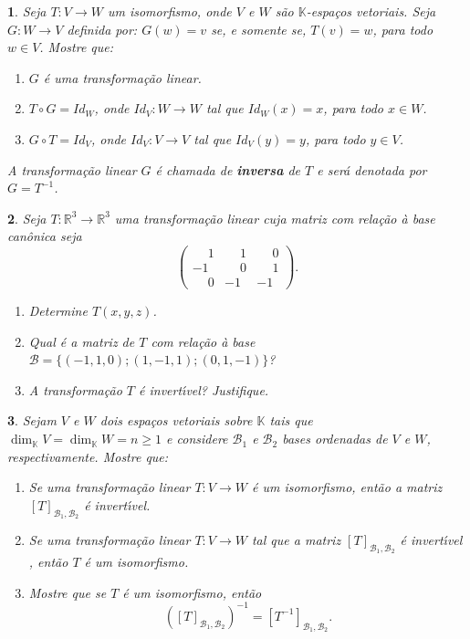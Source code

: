 \documentclass[12pt]{exam}
\newtheorem{exercicio}{}
\newcommand{\real}{\mathbb{R}}
\newcommand{\cp}[1]{\mathbb{#1}}
\begin{document}
\begin{exercicio}
  Seja $T : V \to W$ um isomorfismo, onde $V$ e $W$ s\~ao $\cp{K}$-espa\c{c}os vetoriais. Seja $G : W \to V$ definida por: $G(w) = v$ se, e somente se, $T(v) = w$, para todo $w \in V$. Mostre que:
  \begin{enumerate}[label=({\alph*})]
    \item $G$ \'e uma transforma\c{c}\~ao linear.
    \item $T\circ G = Id_W$, onde $Id_V : W \to W$ tal que $Id_W(x) = x$, para todo $x \in W$.
    \item $G\circ T = Id_V$, onde $Id_V : V \to V$ tal que $Id_V(y) = y$, para todo $y \in V$.
  \end{enumerate}
  A transforma\c{c}\~ao linear $G$ \'e chamada de \textbf{inversa} de $T$ e ser\'a denotada por $G = T^{-1}$.
\end{exercicio}

\begin{exercicio}
  Seja $T : \real^3 \to \real^3$ uma transforma\c{c}\~ao linear cuja matriz com rela\c{c}\~ao \`a base can\^onica seja
  \[
    \begin{pmatrix}
      \phantom{-}1 & \phantom{-}1 & \phantom{-}0\\
      -1 & \phantom{-}0 & \phantom{-}1\\
      \phantom{-}0 & -1 & -1
    \end{pmatrix}.
  \]
    \begin{enumerate}[label=({\alph*})]
      \item Determine $T(x,y,z)$.
      \item Qual \'e a matriz de $T$ com rela\c{c}\~ao \`a base $\mathcal{B} = \{(-1,1,0);(1,-1,1);(0,1,-1)\}$?
      \item A transforma\c{c}\~ao $T$ \'e invert{\'\i}vel? Justifique.
    \end{enumerate}
\end{exercicio}

\begin{exercicio}
  Sejam $V$ e $W$ dois espa\c{c}os vetoriais sobre $\cp{K}$ tais que $\dim_\cp{K}V = \dim_\cp{K}W = n \ge 1$ e considere $\mathcal{B}_1$ e $\mathcal{B}_2$ bases ordenadas de $V$ e $W$, respectivamente. Mostre que:
  \begin{enumerate}[label=({\alph*})]
    \item Se uma transforma\c{c}\~ao linear $T : V \to W$ \'e um isomorfismo, ent\~ao a matriz $[T]_{\mathcal{B}_1,\mathcal{B}_2}$ \'e invert{\'\i}vel.
    \item Se uma transforma\c{c}\~ao linear $T : V \to W$ tal que a matriz $[T]_{\mathcal{B}_1,\mathcal{B}_2}$ \'e invert{\'\i}vel , ent\~ao $T$ \'e um isomorfismo.
    \item Mostre que se $T$ \'e um isomorfismo, ent\~ao
    \[
      \left([T]_{\mathcal{B}_1,\mathcal{B}_2}\right)^{-1} = [T^{-1}]_{\mathcal{B}_1,\mathcal{B}_2}.
    \]
  \end{enumerate}
\end{exercicio}
\end{document}
